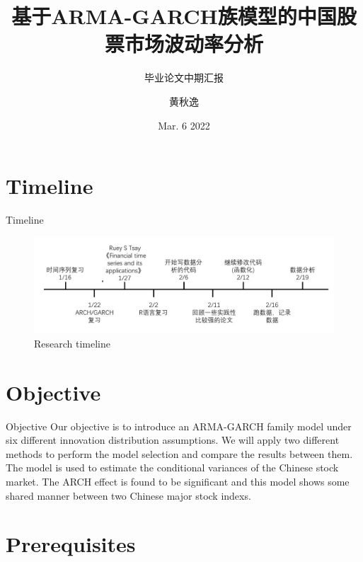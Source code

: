 \documentclass{beamer}
\title[ARMA-GARCH]{\large{基于ARMA-GARCH族模型的中国股票市场波动率分析}}
\subtitle{毕业论文中期汇报}
\author[``Qiuyi HUANG'']{黄秋逸}
\institute[SUSTech]{南方科技大学}
\date{Mar. 6 2022}
\begin{document}

\begin{frame}
  \titlepage
\end{frame}




\section{Timeline}
\begin{frame}{Timeline}
  \begin{figure}[htp]
    \centering
    \includegraphics[width = 12cm]{fig/timeline.jpg}
    \caption{Research timeline}
  \end{figure}
\end{frame}


\section{Objective}
\begin{frame}{Objective}
  Our objective is to introduce an ARMA-GARCH family model under six different innovation distribution assumptions. We will apply two different methods to perform the model selection and compare the results between them. The model is used to estimate the conditional variances of the Chinese stock market. The ARCH effect is found to be significant and this model shows some shared manner between two Chinese major stock indexs.
\end{frame}


\section{Prerequisites}
\end{document}
